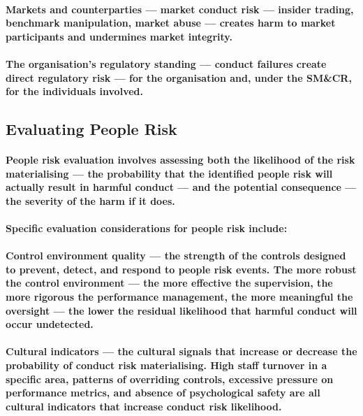 \paragraph{\textbf{Markets and counterparties} — market conduct risk — insider trading, benchmark manipulation, market abuse — creates harm to market participants and undermines market integrity.}
\paragraph{\textbf{The organisation's regulatory standing} — conduct failures create direct regulatory risk — for the organisation and, under the SM\&CR, for the individuals involved.}

\subsection{Evaluating People Risk}
\paragraph{People risk evaluation involves assessing both the likelihood of the risk materialising — the probability that the identified people risk will actually result in harmful conduct — and the potential consequence — the severity of the harm if it does.}
\paragraph{Specific evaluation considerations for people risk include:}
\paragraph{\textbf{Control environment quality} — the strength of the controls designed to prevent, detect, and respond to people risk events. The more robust the control environment — the more effective the supervision, the more rigorous the performance management, the more meaningful the oversight — the lower the residual likelihood that harmful conduct will occur undetected.}
\paragraph{\textbf{Cultural indicators} — the cultural signals that increase or decrease the probability of conduct risk materialising. High staff turnover in a specific area, patterns of overriding controls, excessive pressure on performance metrics, and absence of psychological safety are all cultural indicators that increase conduct risk likelihood.}

